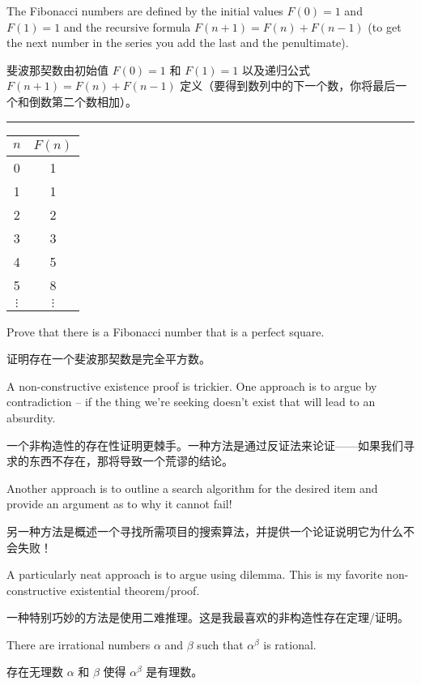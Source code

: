\begin{exer}
The Fibonacci numbers are defined by the initial values $F(0)=1$
and $F(1)=1$ and the recursive formula $F(n+1) = F(n)+F(n-1)$ (to
get the next number in the series you add the last and the penultimate).

斐波那契数由初始值 $F(0)=1$ 和 $F(1)=1$ 以及递归公式 $F(n+1) = F(n)+F(n-1)$ 定义（要得到数列中的下一个数，你将最后一个和倒数第二个数相加）。
\rule{72pt}{0pt} \begin{tabular}{c|c}
$n$ & $F(n)$ \\ \hline
0 & 1 \\
1 & 1 \\
2 & 2 \\
3 & 3 \\
4 & 5 \\
5 & 8 \\
$\vdots$ & $\vdots$\\
\end{tabular}
\medskip

Prove that there is a Fibonacci number that is a perfect square.

证明存在一个斐波那契数是完全平方数。
\end{exer}

A non-constructive existence proof is trickier.  One approach is to argue
by contradiction -- if the thing we're seeking doesn't exist that will
lead to an absurdity.

一个非构造性的存在性证明更棘手。一种方法是通过反证法来论证——如果我们寻求的东西不存在，那将导致一个荒谬的结论。

Another approach is to outline a search algorithm
for the desired item and provide an argument as to why it cannot fail!

另一种方法是概述一个寻找所需项目的搜索算法，并提供一个论证说明它为什么不会失败！

A particularly neat approach is to argue using dilemma.
This is my favorite non-constructive existential theorem/proof.

一种特别巧妙的方法是使用二难推理。这是我最喜欢的非构造性存在定理/证明。
\begin{thm}
There are irrational numbers $\alpha$ and $\beta$ such that $\alpha^\beta$
is rational.

存在无理数 $\alpha$ 和 $\beta$ 使得 $\alpha^\beta$ 是有理数。
\end{thm}

